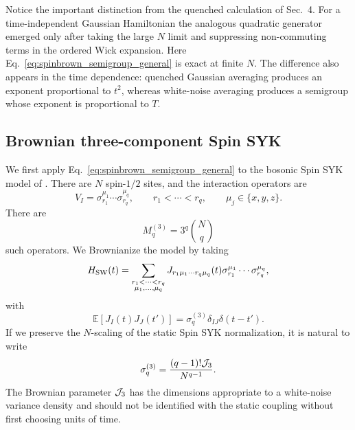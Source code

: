 \documentclass{article}
\theoremstyle{definition}
\begin{document}
Notice the important distinction from the quenched calculation of Sec.~4.
For a time-independent Gaussian Hamiltonian the analogous quadratic
generator emerged only after taking the large $N$ limit and suppressing
non-commuting terms in the ordered Wick expansion.  Here
Eq.~\eqref{eq:spinbrown_semigroup_general} is exact at finite $N$.  The
difference also appears in the time dependence: quenched Gaussian averaging
produces an exponent proportional to $t^2$, whereas white-noise averaging
produces a semigroup whose exponent is proportional to $T$.


\subsection{Brownian three-component Spin SYK}
\label{subsec:brownian_swingle}

We first apply Eq.~\eqref{eq:spinbrown_semigroup_general} to the bosonic
Spin SYK model of \cite{SwingleWiner2024}.  There are $N$ spin-$1/2$ sites,
and the interaction operators are
\begin{equation}
    V_{I}
    =
    \sigma_{r_1}^{\mu_1}
    \cdots
    \sigma_{r_q}^{\mu_q},
    \qquad
    r_1<\cdots<r_q,
    \qquad
    \mu_j\in\{x,y,z\}.
    \label{eq:spinbrown_SW_VI}
\end{equation}
There are
\begin{equation}
    M_q^{(3)}
    =
    3^q\binom{N}{q}
\end{equation}
such operators.  We Brownianize the model by taking
\begin{equation}
    H_{\rm SW}(t)
    =
    \sum_{\substack{r_1<\cdots<r_q\\
                    \mu_1,\ldots,\mu_q}}
    J_{r_1\mu_1\cdots r_q\mu_q}(t)
    \sigma_{r_1}^{\mu_1}\cdots\sigma_{r_q}^{\mu_q},
    \label{eq:spinbrown_SW_H}
\end{equation}
with
\begin{equation}
    \mathbb E[J_I(t)J_J(t')]
    =
    \sigma_q^{(3)}
    \delta_{IJ}\delta(t-t').
    \label{eq:spinbrown_SW_noise}
\end{equation}
If we preserve the $N$-scaling of the static Spin SYK normalization, it is
natural to write
\begin{equation}
    \sigma_q^{(3)}
    =
    \frac{(q-1)!{\cal J}_3}{N^{q-1}} .
    \label{eq:spinbrown_SW_sigma}
\end{equation}
The Brownian parameter ${\cal J}_3$ has the dimensions appropriate to a
white-noise variance density and should not be identified with the static
coupling without first choosing units of time.
\end{document}
